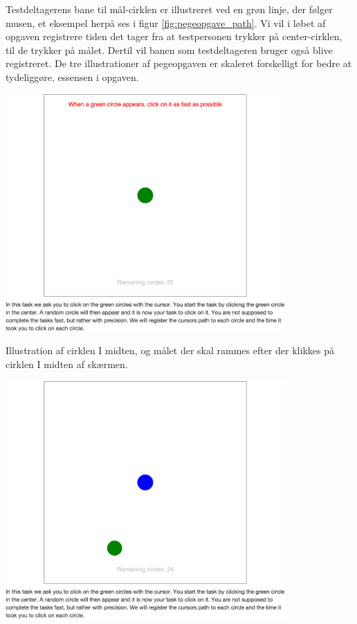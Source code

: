 Testdeltagerens bane til mål-cirklen er illustreret ved en grøn linje, der følger musen, et eksempel herpå ses i figur \ref{fig:pegeopgave_path}. Vi vil i løbet af opgaven registrere tiden det tager fra at testpersonen trykker på center-cirklen, til de trykker på målet. Dertil vil banen som testdeltageren bruger også blive registreret. De tre illustrationer af pegeopgaven er skaleret forskelligt for bedre at tydeliggøre, essensen i opgaven.

\begin{minipage}[t]{.5\linewidth}
\centering
\vspace{0pt}
\includegraphics[width=0.8\textwidth, trim = 8cm 20cm 8cm 15cm, clip]{images/screenshots/ex_step_6_pointing_start}
\label{fig:pegeopgave_start}
\caption{Illustration af cirklen I midten, og målet der skal rammes efter der klikkes på cirklen I midten af skærmen.}
\includegraphics[width=0.8\textwidth, trim = 8cm 8cm 8cm 15cm, clip]{images/screenshots/ex_step_6_pointing_target_1}

\end{minipage}
